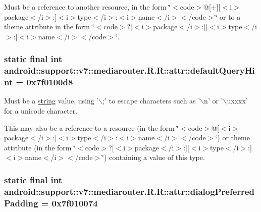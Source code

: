 Must be a reference to another resource, in the form \char`\"{}$<$code$>$@\mbox{[}+\mbox{]}\mbox{[}$<$i$>$package$<$/i$>$:\mbox{]}$<$i$>$type$<$/i$>$:$<$i$>$name$<$/i$>$$<$/code$>$\char`\"{} or to a theme attribute in the form \char`\"{}$<$code$>$?\mbox{[}$<$i$>$package$<$/i$>$:\mbox{]}\mbox{[}$<$i$>$type$<$/i$>$:\mbox{]}$<$i$>$name$<$/i$>$$<$/code$>$\char`\"{}. \hypertarget{classandroid_1_1support_1_1v7_1_1mediarouter_1_1_r_1_1attr_5529585016e0226a7cbea5a80afdccbc}{
\subsubsection[{defaultQueryHint}]{\setlength{\rightskip}{0pt plus 5cm}static final int android::support::v7::mediarouter.R.R::attr::defaultQueryHint = 0x7f0100d8}}
\label{classandroid_1_1support_1_1v7_1_1mediarouter_1_1_r_1_1attr_5529585016e0226a7cbea5a80afdccbc}


Must be a \hyperlink{classandroid_1_1support_1_1v7_1_1mediarouter_1_1_r_1_1string}{string} value, using '$\backslash$;' to escape characters such as '$\backslash$n' or '$\backslash$uxxxx' for a unicode character. 

This may also be a reference to a resource (in the form \char`\"{}$<$code$>$@\mbox{[}$<$i$>$package$<$/i$>$:\mbox{]}$<$i$>$type$<$/i$>$:$<$i$>$name$<$/i$>$$<$/code$>$\char`\"{}) or theme attribute (in the form \char`\"{}$<$code$>$?\mbox{[}$<$i$>$package$<$/i$>$:\mbox{]}\mbox{[}$<$i$>$type$<$/i$>$:\mbox{]}$<$i$>$name$<$/i$>$$<$/code$>$\char`\"{}) containing a value of this type. \hypertarget{classandroid_1_1support_1_1v7_1_1mediarouter_1_1_r_1_1attr_247ba2fdb4f97bcdbb8f076efdafb1dd}{
\subsubsection[{dialogPreferredPadding}]{\setlength{\rightskip}{0pt plus 5cm}static final int android::support::v7::mediarouter.R.R::attr::dialogPreferredPadding = 0x7f010074}}
\label{classandroid_1_1support_1_1v7_1_1mediarouter_1_1_r_1_1attr_247ba2fdb4f97bcdbb8f076efdafb1dd}


